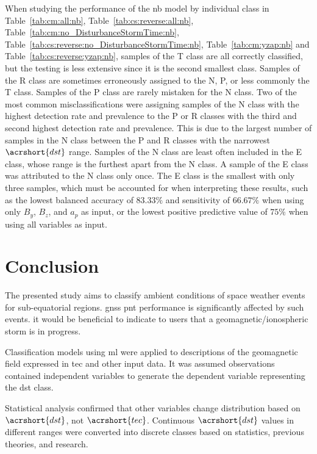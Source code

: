 \documentclass[sn-mathphys-num]{sn-jnl}%
\begin{document}
When studying the performance of the \acrshort{nb} model by individual class in Table~\ref{tab:cm:all:nb}, Table~\ref{tab:cs:reverse:all:nb}, Table~\ref{tab:cm:no_DisturbanceStormTime:nb}, Table~\ref{tab:cs:reverse:no_DisturbanceStormTime:nb}, Table~\ref{tab:cm:yzap:nb} and Table~\ref{tab:cs:reverse:yzap:nb}, samples of the T class are all correctly classified, but the testing is less extensive since it is the second smallest class. Samples of the R class are sometimes erroneously assigned to the N, P, or less commonly the T class. Samples of the P class are rarely mistaken for the N class. Two of the most common misclassifications were assigning samples of the N class with the highest detection rate and prevalence to the P or R classes with the third and second highest detection rate and prevalence. This is due to the largest number of samples in the N class between the P and R classes with the narrowest $\acrshort{dst}$ range. Samples of the N class are least often included in the E class, whose range is the furthest apart from the N class. A sample of the E class was attributed to the N class only once. The E class is the smallest with only three samples, which must be accounted for when interpreting these results, such as the lowest balanced accuracy of $83.33\%$ and sensitivity of $66.67\%$ when using only $B_{y}$, $B_{z}$, and $a_{p}$ as input, or the lowest positive predictive value of $75\%$ when using all variables as input.

\section{Conclusion}
\label{sec:Conclusion}

The presented study aims to classify ambient conditions of space weather events for sub-equatorial regions. \acrfull{gnss} \acrfull{pnt} performance is significantly affected by such events. it would be beneficial to indicate to users that a geomagnetic/ionospheric storm is in progress. 

Classification models using \acrlong{ml} were applied to descriptions of the geomagnetic field expressed in \acrfull{tec} and other input data. It was assumed observations contained independent variables to generate the dependent variable representing the \acrfull{dst} class. 

Statistical analysis confirmed that other variables change distribution based on $\acrshort{dst}$, not $\acrshort{tec}$. Continuous $\acrshort{dst}$ values in different ranges were converted into discrete classes based on statistics, previous theories, and research. 
\end{document}
